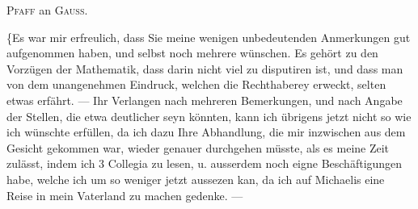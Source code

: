 \begin{center}\large\textsc{Pfaff} an \textsc{Gauss}.\end{center}
\noindent{}\par
\noindent\hspace*{\parindent}\{Es war mir erfreulich, dass Sie meine wenigen unbedeutenden Anmerkungen
gut aufgenommen haben, und selbst noch mehrere wünschen. Es gehört zu den Vorzügen der
Mathematik, dass darin nicht viel zu disputiren ist, und dass man von dem unangenehmen Eindruck,
welchen die Rechthaberey erweckt, selten etwas erfährt. — Ihr Verlangen nach mehreren Bemerkungen,
und nach Angabe der Stellen, die etwa deutlicher seyn könnten, kann ich übrigens jetzt nicht so
wie ich wünschte erfüllen, da ich dazu Ihre Abhandlung, die mir inzwischen aus dem Gesicht
gekommen war, wieder genauer durchgehen müsste, als es meine Zeit zulässt, indem ich 3 Collegia
zu lesen, u. ausserdem noch eigne Beschäftigungen habe, welche ich um so weniger jetzt aussezen
kan, da ich auf Michaelis eine Reise in mein Vaterland zu machen gedenke. —

